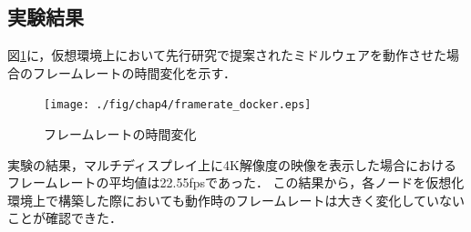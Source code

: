 \subsection*{実験結果}
図\ref{framerate}に，仮想環境上において先行研究で提案されたミドルウェアを動作させた場合のフレームレートの時間変化を示す．

\begin{figure}[H]
    \hspace*{\fill}
    \texttt{[image: ./fig/chap4/framerate\_docker.eps]}
    \hspace*{\fill}
    \caption{フレームレートの時間変化}
    \label{framerate}
\end{figure}

実験の結果，マルチディスプレイ上に4K解像度の映像を表示した場合におけるフレームレートの平均値は22.55fpsであった．
この結果から，各ノードを仮想化環境上で構築した際においても動作時のフレームレートは大きく変化していないことが確認できた．